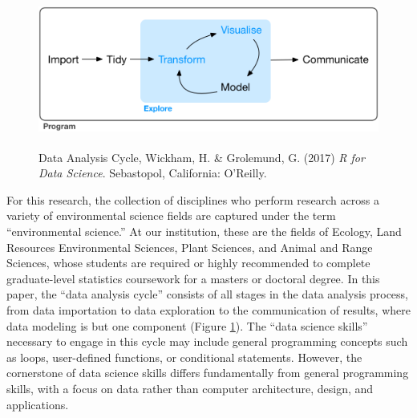 \documentclass[12pt]{article}
\begin{document}
\begin{figure}[h!]
    \centering
    \includegraphics[width = \textwidth, height = 2in]{images/data-science-explore.png}
    \caption{Data Analysis Cycle, Wickham, H. \& Grolemund, G. (2017) \emph{R 
    for Data Science}. Sebastopol, California: O'Reilly.}
\label{fig:cycle}
\end{figure}

\quad For this research, the collection of disciplines who perform research 
across a variety of environmental science fields are captured under the term 
``environmental science.'' At our institution, these are the fields of Ecology, 
Land Resources Environmental Sciences, Plant Sciences, and Animal and Range 
Sciences, whose students are required or highly recommended to complete 
graduate-level statistics coursework for a masters or doctoral degree. In this 
paper, the ``data analysis cycle'' consists of all stages in the data analysis 
process, from data importation to data exploration to the communication of 
results, where data modeling is but one component (Figure \ref{fig:cycle}). 
The ``data science skills'' necessary to engage in this cycle may include 
general programming concepts such as loops, user-defined functions, or 
conditional statements. However, the cornerstone of data science skills differs
fundamentally from general programming skills, with a focus on data rather than 
computer architecture, design, and applications. 
\end{document}
